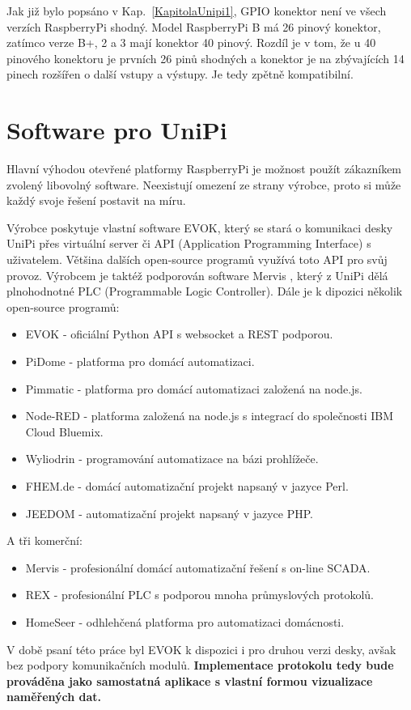 Jak již bylo popsáno v Kap.~\ref{KapitolaUnipi1}, GPIO konektor není ve všech verzích RaspberryPi shodný. Model RaspberryPi B má 26 pinový konektor, zatímco verze B+, 2 a 3 mají konektor 40 pinový. Rozdíl je v tom, že u 40 pinového konektoru je prvních 26 pinů shodných a konektor je na zbývajících 14 pinech rozšířen o další vstupy a výstupy. Je tedy zpětně kompatibilní.




\section{Software pro UniPi}

Hlavní výhodou otevřené platformy RaspberryPi je možnost použít zákazníkem zvolený libovolný software. Neexistují omezení ze strany výrobce, proto si může každý svoje řešení postavit na míru.

Výrobce poskytuje vlastní software EVOK, který se stará o komunikaci desky UniPi přes virtuální server či API (Application Programming Interface) s uživatelem. Většina dalších open-source programů využívá toto API pro svůj provoz. Výrobcem je taktéž podporován software Mervis \cite{MervisWeb}, který z UniPi dělá plnohodnotné PLC (Programmable Logic Controller). Dále je k dipozici několik open-source programů:
\begin{itemize}
\item EVOK - oficiální Python API s websocket a REST podporou.
\item PiDome - platforma pro domácí automatizaci.
\item Pimmatic - platforma pro domácí automatizaci založená na node.js.
\item Node-RED - platforma založená na node.js s integrací do společnosti IBM Cloud Bluemix.
\item Wyliodrin - programování automatizace na bázi prohlížeče.
\item FHEM.de - domácí automatizační projekt napsaný v jazyce Perl.
\item JEEDOM - automatizační projekt napsaný v jazyce PHP.
\end{itemize}

\vspace{10pt}
A tři komerční:
\begin{itemize}
\item Mervis - profesionální domácí automatizační řešení s on-line SCADA.
\item REX - profesionální PLC s podporou mnoha průmyslových protokolů.
\item HomeSeer - odhlehčená platforma pro automatizaci domácnosti.
\end{itemize}

\vspace{10pt}
V době psaní této práce byl EVOK k dispozici i pro druhou verzi desky, avšak bez podpory komunikačních modulů. \textbf{Implementace protokolu tedy bude prováděna jako samostatná aplikace s vlastní formou vizualizace naměřených dat.}





 